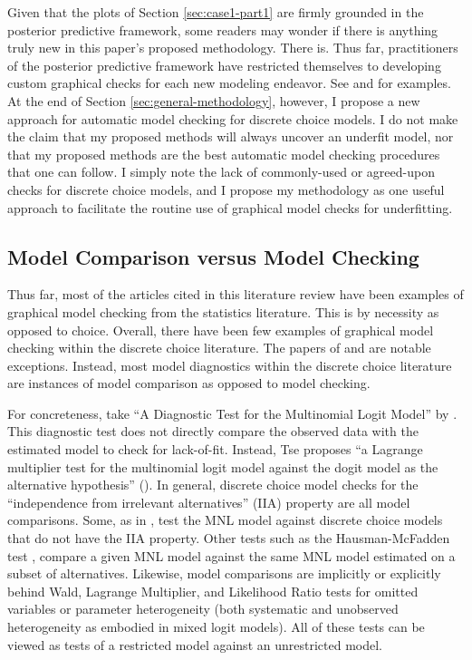 \documentclass[preprint]{elsarticle}
\begin{document}
Given that the plots of Section \ref{sec:case1-part1} are firmly grounded in the posterior predictive framework, some readers may wonder if there is anything truly new in this paper's proposed methodology. There is. Thus far, practitioners of the posterior predictive framework have restricted themselves to developing custom graphical checks for each new modeling endeavor. See \citet{gelman_diagnostic_2000} and \citet{carlin_case_2001} for examples. At the end of Section \ref{sec:general-methodology}, however, I propose a new approach for automatic model checking for discrete choice models. I do not make the claim that my proposed methods will always uncover an underfit model, nor that my proposed methods are the best automatic model checking procedures that one can follow. I simply note the lack of commonly-used or agreed-upon checks for discrete choice models, and I propose my methodology as one useful approach to facilitate the routine use of graphical model checks for underfitting.

\subsection{Model Comparison versus Model Checking}
\label{sec:review-model-comparison}
Thus far, most of the articles cited in this literature review have been examples of graphical model checking from the statistics literature. This is by necessity as opposed to choice. Overall, there have been few examples of graphical model checking within the discrete choice literature. The papers of \citet{dunn_graphical_1987} and \citet{nagel_diagnostics_1992} are notable exceptions. Instead, most model diagnostics within the discrete choice literature are instances of model comparison as opposed to model checking.

For concreteness, take ``A Diagnostic Test for the Multinomial Logit Model'' by \citet{tse_diagnostic_1987}. This diagnostic test does not directly compare the observed data with the estimated model to check for lack-of-fit. Instead, Tse proposes ``a Lagrange multiplier test for the multinomial logit model against the dogit model as the alternative hypothesis'' (\citeyear{tse_diagnostic_1987}). In general, discrete choice model checks for the ``independence from irrelevant alternatives'' (IIA) property are all model comparisons. Some, as in \citet{tse_diagnostic_1987}, test the MNL model against discrete choice models that do not have the IIA property. Other tests such as the Hausman-McFadden test \citep{hausman_specification_1984}, compare a given MNL model against the same MNL model estimated on a subset of alternatives. Likewise, model comparisons are implicitly or explicitly behind Wald, Lagrange Multiplier, and Likelihood Ratio tests for omitted variables or parameter heterogeneity (both systematic and unobserved heterogeneity as embodied in mixed logit models). All of these tests can be viewed as tests of a restricted model against an unrestricted model.
\end{document}
